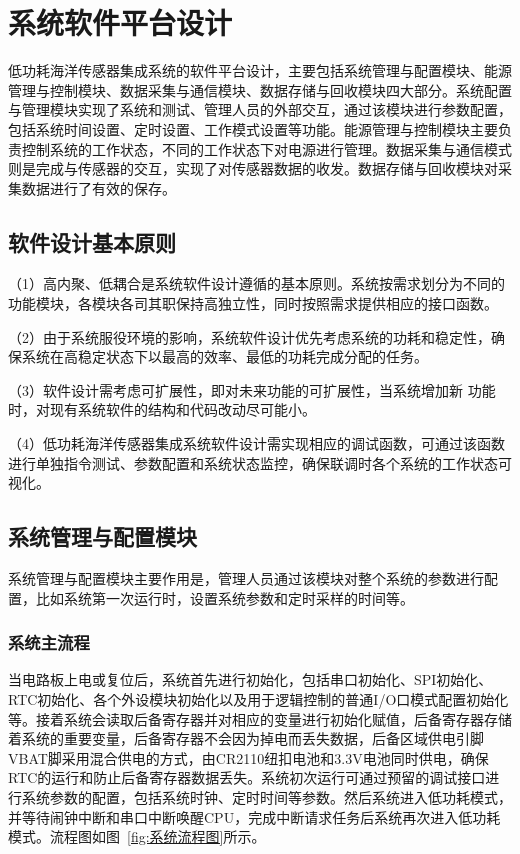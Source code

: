 \chapter{系统软件平台设计}
低功耗海洋传感器集成系统的软件平台设计，主要包括系统管理与配置模块、能源管理与控制模块、数据采集与通信模块、数据存储与回收模块四大部分。系统配置与管理模块实现了系统和测试、管理人员的外部交互，通过该模块进行参数配置，包括系统时间设置、定时设置、工作模式设置等功能。能源管理与控制模块主要负责控制系统的工作状态，不同的工作状态下对电源进行管理。数据采集与通信模式则是完成与传感器的交互，实现了对传感器数据的收发。数据存储与回收模块对采集数据进行了有效的保存。

\section{软件设计基本原则}
（1）高内聚、低耦合是系统软件设计遵循的基本原则。系统按需求划分为不同的功能模块，各模块各司其职保持高独立性，同时按照需求提供相应的接口函数。

（2）由于系统服役环境的影响，系统软件设计优先考虑系统的功耗和稳定性，确保系统在高稳定状态下以最高的效率、最低的功耗完成分配的任务。 

（3）软件设计需考虑可扩展性，即对未来功能的可扩展性，当系统增加新 功能时，对现有系统软件的结构和代码改动尽可能小。

（4）低功耗海洋传感器集成系统软件设计需实现相应的调试函数，可通过该函数进行单独指令测试、参数配置和系统状态监控，确保联调时各个系统的工作状态可视化。

\section{系统管理与配置模块}
系统管理与配置模块主要作用是，管理人员通过该模块对整个系统的参数进行配置，比如系统第一次运行时，设置系统参数和定时采样的时间等。
\subsection{系统主流程}
当电路板上电或复位后，系统首先进行初始化，包括串口初始化、SPI初始化、RTC初始化、各个外设模块初始化以及用于逻辑控制的普通I/O口模式配置初始化等。接着系统会读取后备寄存器并对相应的变量进行初始化赋值，后备寄存器存储着系统的重要变量，后备寄存器不会因为掉电而丢失数据，后备区域供电引脚VBAT脚采用混合供电的方式，由CR2110纽扣电池和3.3V电池同时供电，确保RTC的运行和防止后备寄存器数据丢失。系统初次运行可通过预留的调试接口进行系统参数的配置，包括系统时钟、定时时间等参数。然后系统进入低功耗模式，并等待闹钟中断和串口中断唤醒CPU，完成中断请求任务后系统再次进入低功耗模式。流程图如图~\ref{fig:系统流程图}所示。

